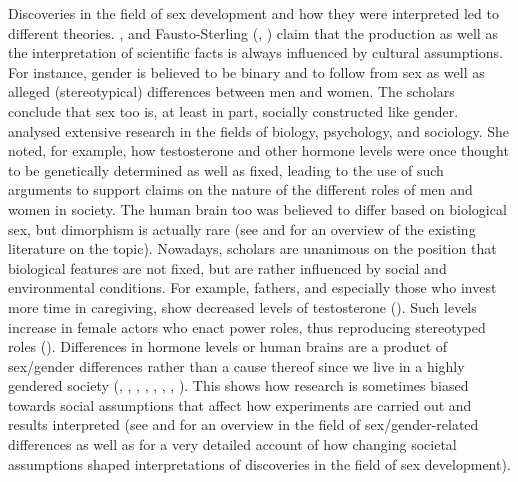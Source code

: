 Discoveries in the field of sex development and how they were interpreted led to different theories. \textcite[10--11]{butler1990gender}, \textcite{fine2017testosterone} and Fausto-Sterling (\cite*{sterling2020science}, \cite*{fausto2020sexing}) claim that the production as well as the interpretation of scientific facts is always influenced by cultural assumptions. For instance, gender is believed to be binary and to follow from sex as well as alleged (stereotypical) differences between men and women. The scholars conclude that sex too is, at least in part, socially constructed like gender. \textcite{fine2017testosterone} analysed extensive research in the fields of biology, psychology, and sociology. She noted, for example, how testosterone and other hormone levels were once thought to be genetically determined as well as fixed, leading to the use of such arguments to support claims on the nature of the different roles of men and women in society. The human brain too was believed to differ based on biological sex, but dimorphism is actually rare (see \cite{fine2017testosterone} and \cite[172]{hyde2019future} for an overview of the existing literature on the topic). Nowadays, scholars are unanimous on the position that biological features are not fixed, but are rather influenced by social and environmental conditions. For example, fathers, and especially those who invest more time in caregiving, show decreased levels of testosterone (\cite{gettler2011longitudinal}). Such levels increase in female actors who enact power roles, thus reproducing stereotyped roles (\cite{van2015effects}). Differences in hormone levels or human brains are a product of sex/gender differences rather than a cause thereof since we live in a highly gendered society (\cite[200]{fausto2016critiques}, \cite*{sterling2020science}, \cite{fine2017testosterone}, \cite[142]{barker2018rewriting}, \cite*[36]{barker2018psychology}, \cite{lester2018trans}, \cite[174]{hyde2019future}, \cite[58]{barker2019life}). This shows how research is sometimes biased towards social assumptions that affect how experiments are carried out and results interpreted (see \cite{fine2017testosterone} and \cite{hyde2019future} for an overview in the field of sex/gender-related differences as well as \cite{fausto2020sexing} for a very detailed account of how changing societal assumptions shaped interpretations of discoveries in the field of sex development).

